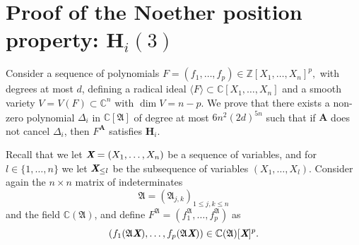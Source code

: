 \documentclass[a4paper]{article}
\def\fA{{\mathfrak A}}
\def\A{\mathfrak{A}}
\def\Lb{\textit{\textbf{L}}}
\def\Xb{\textit{\textbf{X}}}
\def\mA{{\bm A}}
\def\ub{{\bm u}}
\def\xb{\textit{\textbf{x}}}
\def\D{\Delta}
\DeclareMathOperator{\jac}{jac}
\def\minorsfA{\textrm{Minors}(F^{\A},p)}
\newcommand{\ZZ}{{\mathbb{Z}}}
\def\C{\mathbb{C}}
\def\I{\mathfrak{I}}
\def\Il{\mathscr{I}_{\ub}}
\def\IilfA{\mathscr{I}_{\ub}(i,F^{\A})}
\def\WilfA{\mathscr{W}_{\ub}(\pi_i,V^{\fA})}
\def\Wl{\mathscr{W}_{\ub}}
\begin{document}










































\section{Proof of the Noether position property: $\textbf{H}_i(3)$}\label{ssec:Hi2}
Consider a sequence of polynomials $F= (f_1,\hdots,f_p) \in \ZZ[X_1,\hdots,X_n]^p,$ with degrees at most $d$, defining a radical ideal $\langle F \rangle \subset \C[X_1,\hdots,X_n]$ and a smooth variety $V=V(F) \subset \C^n$ with $\dim V = n-p$. We prove that there exists a non-zero polynomial $\D_{i}$ in $\C[\A]$ of degree at most $6n^2(2d)^{5n}$ such that if $\mA$ does not cancel $\D_{i}$, then $F^{\mA}$ satisfies  $\bm H_i$.

Recall that we let $\Xb = (X_1, \hdots , X_n)$ be a sequence of variables, and for $l \in \{1,\hdots,n\}$ we let $\Xb_{\leq l}$ be the subsequence of variables $(X_1, \hdots , X_l)$. Consider again the $n\times n$ matrix of indeterminates
\[\A=(\A_{j,k})_{1 \le j,k \le n}\] and the field $\C(\A)$,
and define $F^{\A}=(f_1^{\A},\hdots,f_p^{\A})$  as \[(f_1(\A\Xb),\hdots,f_p(\A\Xb)) \in \C(\A)[\Xb]^p.\]  
\end{document}
